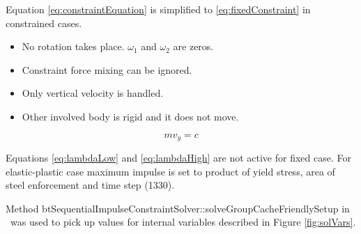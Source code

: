Equation \ref{eq:constraintEquation} is simplified
to \ref{eq:fixedConstraint} in constrained cases.
\begin{itemize}
\item No rotation takes place. $\omega_1$ and $\omega_2$ are zeros.
\item Constraint force mixing can be ignored.
\item Only vertical velocity is handled.
\item Other involved body is rigid and it does not move.
\end{itemize} 

\begin{equation} \label{eq:fixedConstraint}
m v_y = c 
\end{equation}

Equations \ref{eq:lambdaLow} and \ref{eq:lambdaHigh} are not active for fixed case.
For elastic-plastic case maximum impulse is set to product of yield stress, area of steel enforcement and time step (1330).

Method btSequentialImpulseConstraintSolver::solveGroupCacheFriendlySetup
in \bullet\ was used to pick up values for internal variables described in Figure \ref{fig:solVars}. 

